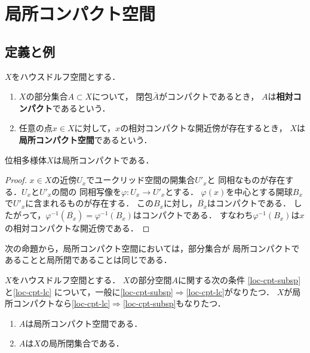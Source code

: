 \section{局所コンパクト空間}
\subsection{定義と例}
\begin{leftbar}
\begin{DFN}
    \(X\)をハウスドルフ空間とする．
    \begin{enumerate}
        \item \(X\)の部分集合\(A\subset X\)について，
        閉包\(\bar{A}\)がコンパクトであるとき，
        \(A\)は\textbf{相対コンパクト}であるという．
        \item 任意の点\(x\in X\)に対して，\(x\)の相対コンパクトな開近傍が存在するとき，
        \(X\)は\textbf{局所コンパクト空間}であるという．
    \end{enumerate}
\end{DFN}
\end{leftbar}

\begin{EG}
    位相多様体\(X\)は局所コンパクトである．
\end{EG}
\begin{proof}
    \(x\in X\)の近傍\(U_x\)でユークリッド空間の開集合\(U'_x\)と
    同相なものが存在する．\(U_x\)と\(U'_x\)の間の
    同相写像を\(\varphi\colon U_x\to U'_x\)とする．
    \(\varphi(x)\)を中心とする開球\(B_x\)で\(U'_x\)に含まれるものが存在する．
    この\(B_x\)に対し，\(\overline{B_x}\)はコンパクトである．
    したがって，\(\varphi^{-1}\left(\overline{B_x}\right)
    =\overline{\varphi^{-1}(B_x)}\)はコンパクトである．
    すなわち\(\varphi^{-1}(B_x)\)は\(x\)の相対コンパクトな開近傍である．
\end{proof}





次の命題から，局所コンパクト空間においては，部分集合が
局所コンパクトであることと局所閉であることは同じである．

\begin{PRP}
    \(X\)をハウスドルフ空間とする．
    \(X\)の部分空間\(A\)に関する次の条件
    \eqref{loc-cpt-subsp}と\eqref{loc-cpt-lc}
    について，一般に\eqref{loc-cpt-subsp}\(\Rightarrow\)\eqref{loc-cpt-lc}がなりたつ．
    \(X\)が局所コンパクトなら\eqref{loc-cpt-lc}\(\Rightarrow\)\eqref{loc-cpt-subsp}もなりたつ．
    \begin{enumerate}[(1)]%
        \item \(A\)は局所コンパクト空間である．\label{loc-cpt-subsp}
        \item \(A\)は\(X\)の局所閉集合である．\label{loc-cpt-lc}
    \end{enumerate}    
\end{PRP}

